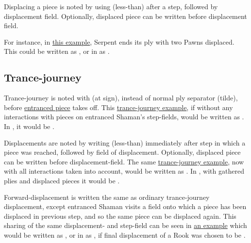 Displacing a piece is noted by using \alg{<} (less-than) after a step, followed by
displacement field. Optionally, displaced piece can be written before displacement
field.

For instance, in \hyperref[fig:scn_tr_19_displacement_init]{this example}, Serpent ends
its ply with two Pawns displaced. This could be written as ,
or in  as\newline
{}.

\subsection*{Trance-journey}
\label{sec:Appendix/Notation/Trance-journey}

Trance-journey is noted with  (at sign), instead of normal ply separator
\alg{\~{}} (tilde), before
\hyperref[fig:scn_cot_072_entrancement_step]{entranced piece} takes off. This
\hyperref[fig:scn_cot_086_light_light_shaman_interaction_start]{trance-journey example},
if without any interactions with pieces on entranced Shaman's step-fields, would be
written as . In , it would be .

Displacements are noted by writing \alg{<} (less-than) immediately after step in
which a piece was reached, followed by field of displacement. Optionally, displaced
piece can be written before displacement-field. The same
\hyperref[fig:scn_cot_087_light_light_shaman_interaction_end]{trance-journey example},
now with all interactions taken into account, would be written as
.
In , with gathered plies and displaced pieces it would be\newline
{}.

Forward-displacement is written the same as ordinary trance-journey displacement,
except entranced Shaman visits a field onto which a piece has been displaced in
previous step, and so the same piece can be displaced again. This sharing of the
same displacement- and step-field can be seen in
\hyperref[fig:scn_cot_098_forward_displacement_start]{an example} which would be
written as , or in  as\newline
{}, if final displacement of
a Rook was chosen to be .

